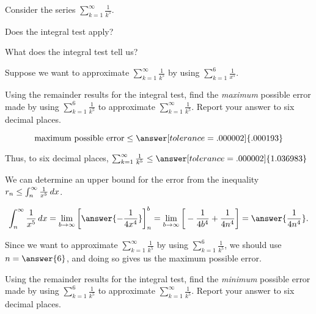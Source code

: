 \documentclass{ximera}
\author{Jim Talamo}
\begin{document}
\begin{exercise}

Consider the series $\sum_{k=1}^{\infty} \frac{1}{k^5}$.  

Does the integral test apply?

\begin{multipleChoice}
\end{multipleChoice}

What does the integral test tell us?
\begin{multipleChoice}
\end{multipleChoice}

Suppose we want to approximate $\sum_{k=1}^{\infty} \frac{1}{k^5}$ by using $\sum_{k=1}^{6} \frac{1}{x^5}$.  

\begin{exercise}
Using the remainder results for the integral test, find the \emph{maximum} possible error made by using $\sum_{k=1}^{6} \frac{1}{k^5}$ to approximate $\sum_{k=1}^{\infty} \frac{1}{k^5}$.  Report your answer to six decimal places.

\[
\textrm{maximum possible error} \leq \answer[tolerance=.000002]{.000193}
\]


Thus, to six decimal places, $\sum_{k=1}^{\infty} \frac{1}{k^5} \leq \answer[tolerance=.000002]{1.036983}$

\begin{hint}
We can determine an upper bound for the error from the inequality $ r_n \leq \int_{n}^{\infty} \frac{1}{x^5} \mathop{}\!d x$. 

\[
\int_n^\infty \frac{1}{x^5} \d x = \lim_{b \to \infty} \eval{\answer{-\frac{1}{4x^4}}}_n^b = \lim_{b \to \infty} \eval{-\frac{1}{4b^4}+\frac{1}{4n^4}} =\answer{\frac{1}{4n^4}}. 
\]

Since we want to approximate $\sum_{k=1}^{\infty} \frac{1}{k^5}$ by using $\sum_{k=1}^{6} \frac{1}{k^5}$, we should use $n=\answer{6}$, and doing so gives us the maximum possible error.
\end{hint}
\end{exercise}

\begin{exercise}
Using the remainder results for the integral test, find the \emph{minimum} possible error made by using $\sum_{k=1}^{6} \frac{1}{k^5}$ to approximate $\sum_{k=1}^{\infty} \frac{1}{k^5}$.  Report your answer to six decimal places.


\end{exercise}
\end{exercise}
\end{document}
